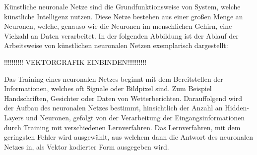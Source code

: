 Künstliche neuronale Netze sind die Grundfunktionsweise von System, welche
künstliche Intelligenz nutzen. Diese Netze bestehen aus einer großen Menge an
Neuronen, welche, genauso wie die Neuronen im menschlichen Gehirn, eine
Vielzahl an Daten verarbeitet. In der folgenden Abbildung ist der Ablauf der
Arbeitsweise von künstlichen neuronalen Netzen exemplarisch dargestellt:

!!!!!!!!!! VEKTORGRAFIK EINBINDEN!!!!!!!!!!

Das Training eines neuronalen Netzes beginnt mit dem Bereitstellen der
Informationen, welches oft Signale oder Bildpixel sind. Zum Beispiel
Handschriften, Gesichter oder Daten von Wetterberichten. Darauffolgend wird der
Aufbau des neuronalen Netzes bestimmt, hinsichtlich der Anzahl an Hidden-Layers
und Neuronen, gefolgt von der Verarbeitung der Eingangsinformationen durch
Training mit verschiedenen Lernverfahren. Das Lernverfahren, mit dem geringsten
Fehler wird ausgewählt, aus welchem dann die Antwort des neuronalen Netzes in,
als Vektor kodierter Form ausgegeben wird.\cite{dorn2016programmieren}